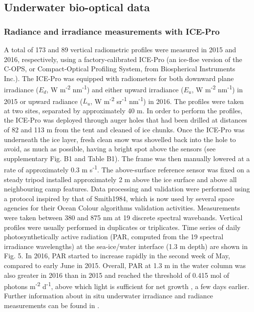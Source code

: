\documentclass[essd, manuscript]{copernicus}
\begin{document}
\subsection{Underwater bio-optical data}

\subsubsection{Radiance and irradiance measurements with ICE-Pro}

A total of 173 and 89 vertical radiometric profiles were measured in 2015 and 2016, respectively, using a factory-calibrated ICE-Pro (an ice-floe version of the C-OPS, or Compact-Optical Profiling System, from Biospherical Instruments Inc.). The ICE-Pro was equipped with radiometers for both downward plane irradiance ($E_d$, W m\textsuperscript{-2} nm\textsuperscript{-1}) and either upward irradiance ($E_u$, W m\textsuperscript{-2} nm\textsuperscript{-1}) in 2015 or upward radiance ($L_u$, W m\textsuperscript{-2} sr\textsuperscript{-1} nm\textsuperscript{-1}) in 2016. The profiles were taken at two sites, separated by approximately 40 m. In order to perform the profiles, the ICE-Pro was deployed through auger holes that had been drilled at distances of 82 and 113  m from the tent and cleaned of ice chunks. Once the ICE-Pro was underneath the ice layer, fresh clean snow was shovelled back into the hole to avoid, as much as possible, having a bright spot above the sensors (see supplementary Fig. B1 and Table B1). The frame was then manually lowered at a rate of approximately 0.3 m s\textsuperscript{-1}. The above-surface reference sensor was fixed on a steady tripod installed approximately 2 m above the ice surface and above all neighbouring camp features. Data processing and validation were performed using a protocol inspired by that of Smith1984, which is now used by several space agencies for their Ocean Colour algorithms validation activities. Measurements were taken between 380 and 875 nm at 19 discrete spectral wavebands. Vertical profiles were usually performed in duplicates or triplicates. Time series of daily photosynthetically active radiation (PAR, computed from the 19 spectral irradiance wavelengths) at the sea-ice/water interface (1.3 m depth) are shown in Fig. 5. In 2016, PAR started to increase rapidly in the second week of May, compared to early June in 2015. Overall, PAR at 1.3 m in the water column was also greater in 2016 than in 2015 and reached the threshold of 0.415 mol of photons m\textsuperscript{-2} d\textsuperscript{-1}, above which light is sufficient for net growth \citep{Letelier2004}, a few days earlier. Further information about in situ underwater irradiance and radiance measurements can be found in \citet{Massicotte2018}. 
\end{document}
